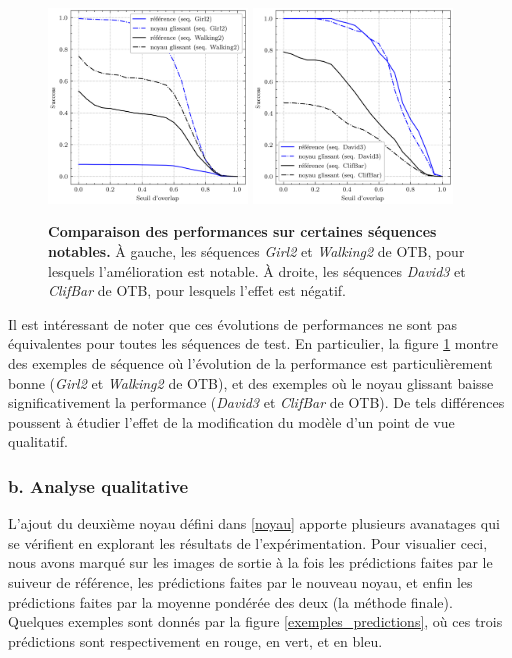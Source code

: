 \documentclass[10pt,twocolumn,letterpaper,french]{article}
\begin{document}
  \begin{figure}[!h]
  \centering
  \includegraphics[width=150pt]{images/gamma/courbes_succ_mutli.png} 
  \includegraphics[width=150pt]{images/gamma/courbes_succ_mutli_bof.png} 
  \caption{\textbf{Comparaison des performances sur certaines séquences notables.} À gauche, les séquences \textit{Girl2} et \textit{Walking2} de OTB, pour lesquels l'amélioration est notable. À droite, les séquences \textit{David3} et \textit{ClifBar} de OTB, pour lesquels l'effet est négatif.}
  \label{courbes_prec3}
  \end{figure}
 

Il est intéressant de noter que ces évolutions de performances ne sont pas équivalentes pour toutes les séquences de test. En particulier, la figure  \ref{courbes_prec3} montre des exemples de séquence où l'évolution de la performance est particulièrement bonne (\textit{Girl2} et \textit{Walking2} de OTB), et des exemples où le noyau glissant baisse significativement la performance  (\textit{David3} et \textit{ClifBar} de OTB). De tels différences poussent à étudier l'effet de la modification du modèle d'un point de vue qualitatif.
  




\subsubsection*{b. Analyse qualitative}


L'ajout du deuxième noyau défini dans \ref{noyau} apporte plusieurs avanatages qui se vérifient en explorant les résultats de l'expérimentation. Pour visualier ceci, nous avons marqué sur les images de sortie à la fois les prédictions faites par le suiveur de référence, les prédictions faites par le nouveau noyau, et enfin les prédictions faites par la moyenne pondérée des deux (la méthode finale). Quelques exemples sont donnés par la figure \ref{exemples_predictions}, où ces trois prédictions sont respectivement en rouge, en vert, et en bleu.
\end{document}
